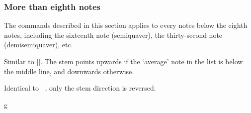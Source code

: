 \subsubsection{More than eighth notes}\label{sec:music-notes:commands:more-than-eighth}
The commands described in this section applies to every notes below the eighth 
notes, including the sixteenth note (semiquaver), the thirty-second note 
(demisemiquaver), etc.
\begin{command}{\tmmorethaneighth{}}
  Similar to |\tmwhole|. The stem points upwards if the `average' note 
  in the list is below the middle line, and downwards otherwise.
\end{command}
\begin{command}{\tmmorethaneighth*{}}
  Identical to |\tmmorethaneighth|, only the stem direction is reversed.
\end{command}
\begin{codeexample}[]
\begin{tmline}%
\begin{tmstaff}{g}{}
\end{tmstaff}%
\end{tmline}
\end{codeexample}
